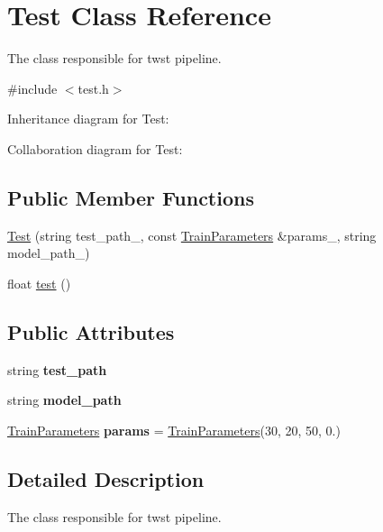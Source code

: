 \hypertarget{classTest}{}\section{Test Class Reference}
\label{classTest}


The class responsible for twst pipeline.  




{\ttfamily \#include $<$test.\+h$>$}



Inheritance diagram for Test\+:


Collaboration diagram for Test\+:
\subsection*{Public Member Functions}
\begin{DoxyCompactItemize}
\item 
\hyperlink{classTest_a6eeaef1054e710158c2d48a6c3497a23}{Test} (string test\+\_\+path\+\_\+, const \hyperlink{structTrainParameters}{Train\+Parameters} \&params\+\_\+, string model\+\_\+path\+\_\+)
\item 
float \hyperlink{classTest_ae984138ce2da7b201d3fa97a4b775fb3}{test} ()
\end{DoxyCompactItemize}
\subsection*{Public Attributes}
\begin{DoxyCompactItemize}
\item 
\mbox{\label{classTest_a21a60879556addaa11427cb30b9be5fc}} 
string {\bfseries test\+\_\+path}
\item 
\mbox{\label{classTest_a857cf5151c5bd7e29d33569bd7237fde}} 
string {\bfseries model\+\_\+path}
\item 
\mbox{\label{classTest_a25806965ae8a4513ccad5ad31ce8a8df}} 
\hyperlink{structTrainParameters}{Train\+Parameters} {\bfseries params} = \hyperlink{structTrainParameters}{Train\+Parameters}(30, 20, 50, 0.)
\end{DoxyCompactItemize}


\subsection{Detailed Description}
The class responsible for twst pipeline. 

